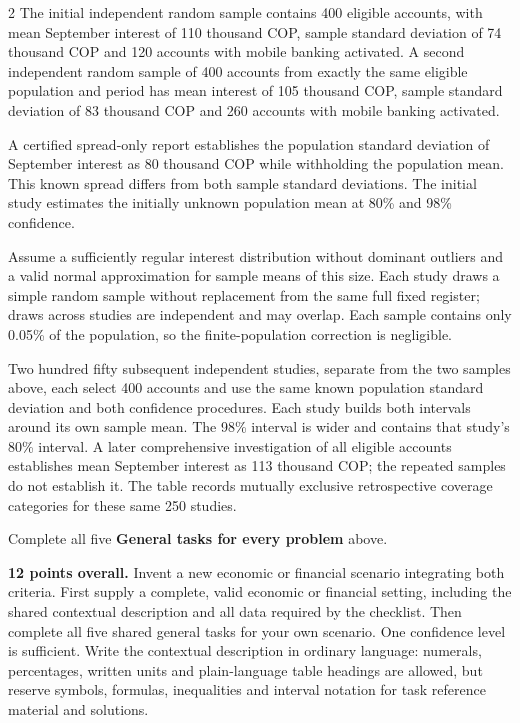 \begin{multicols}{2}
The initial independent random sample contains 400 eligible accounts, with mean September interest of 110 thousand COP, sample standard deviation of 74 thousand COP and 120 accounts with mobile banking activated. A second independent random sample of 400 accounts from exactly the same eligible population and period has mean interest of 105 thousand COP, sample standard deviation of 83 thousand COP and 260 accounts with mobile banking activated.

A certified spread-only report establishes the population standard deviation of September interest as 80 thousand COP while withholding the population mean. This known spread differs from both sample standard deviations. The initial study estimates the initially unknown population mean at 80\% and 98\% confidence.

Assume a sufficiently regular interest distribution without dominant outliers and a valid normal approximation for sample means of this size. Each study draws a simple random sample without replacement from the same full fixed register; draws across studies are independent and may overlap. Each sample contains only 0.05\% of the population, so the finite-population correction is negligible.

Two hundred fifty subsequent independent studies, separate from the two samples above, each select 400 accounts and use the same known population standard deviation and both confidence procedures. Each study builds both intervals around its own sample mean. The 98\% interval is wider and contains that study's 80\% interval. A later comprehensive investigation of all eligible accounts establishes mean September interest as 113 thousand COP; the repeated samples do not establish it. The table records mutually exclusive retrospective coverage categories for these same 250 studies.


Complete all five \textbf{General tasks for every problem} above.

\columnbreak

\textbf{12 points overall.}
Invent a new economic or financial scenario integrating both criteria. First supply a complete, valid economic or financial setting, including the shared contextual description and all data required by the checklist. Then complete all five shared general tasks for your own scenario. One confidence level is sufficient. Write the contextual description in ordinary language: numerals, percentages, written units and plain-language table headings are allowed, but reserve symbols, formulas, inequalities and interval notation for task reference material and solutions.


\end{multicols}
